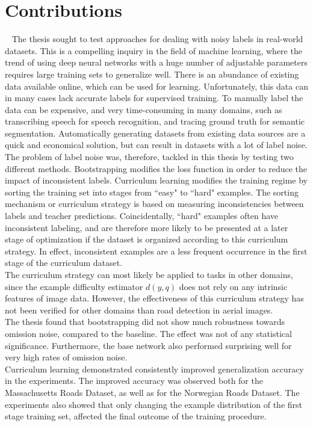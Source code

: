 \section{Contributions}~\label{cont}
\label{sec:Contributions}
The thesis sought to test approaches for dealing with noisy labels in real-world datasets. This is a compelling inquiry in the field of machine learning, where the trend of using deep neural networks with a huge number of adjustable parameters requires large training sets to generalize well. There is an abundance of existing data available online, which can be used for learning. Unfortunately, this data can in many cases lack accurate labels for supervised training. To manually label the data can be expensive, and very time-consuming in many domains, such as transcribing speech for speech recognition, and tracing ground truth for semantic segmentation. Automatically generating datasets from existing data sources are a quick and economical solution, but can result in datasets with a lot of label noise.\\

The problem of label noise was, therefore, tackled in this thesis by testing two different methods. Bootstrapping modifies the loss function in order to reduce the impact of inconsistent labels. Curriculum learning modifies the training regime by sorting the training set into stages from ``easy" to ``hard" examples. The sorting mechanism or curriculum strategy is based on measuring inconsistencies between labels and teacher predictions. Coincidentally, ``hard" examples often have inconsistent labeling, and are therefore more likely to be presented at a later stage of optimization if the dataset is organized according to this curriculum strategy. In effect, inconsistent examples are a less frequent occurrence in the first stage of the curriculum dataset.\\
 
The curriculum strategy can most likely be applied to tasks in other domains, since the example difficulty estimator $d(y,q)$ does not rely on any intrinsic features of image data. However, the effectiveness of this curriculum strategy has not been verified for other domains than road detection in aerial images.\\

The thesis found that bootstrapping did not show much robustness towards omission noise, compared to the baseline. The effect was not of any statistical significance. Furthermore, the base network also performed surprising well for very high rates of omission noise. \\

Curriculum learning demonstrated consistently improved generalization accuracy in the experiments. The improved accuracy was observed both for the Massachusetts Roads Dataset, as well as for the Norwegian Roads Dataset. The experiments also showed that only changing the example distribution of the first stage training set, affected the final outcome of the training procedure.\\

